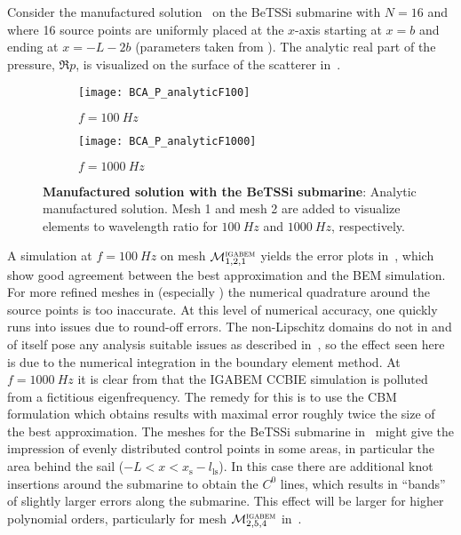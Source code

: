 Consider the manufactured solution~ on the BeTSSi submarine with $N=16$ and where 16 source points are uniformly placed at the $x$-axis starting at $x=b$ and ending at $x=-L-2b$ (parameters taken from ). The analytic real part of the pressure, $\Re{p}$, is visualized on the surface of the scatterer in~. 
\begin{figure}
	\centering
	\begin{subfigure}[t]{\textwidth}
		\texttt{[image: BCA\_P\_analyticF100]}
		\caption{$f=\SI{100}{Hz}$}
	\end{subfigure} 
	\par\bigskip
	\begin{subfigure}[t]{\textwidth}
		\texttt{[image: BCA\_P\_analyticF1000]}
		\caption{$f=\SI{1000}{Hz}$}
	\end{subfigure} 
	\caption{\textbf{Manufactured solution with the BeTSSi submarine}: Analytic manufactured solution. Mesh 1 and mesh 2 are added to visualize elements to wavelength ratio for $\SI{100}{Hz}$ and $\SI{1000}{Hz}$, respectively.}
	\label{Fig3:BCA_P_analytic}
\end{figure}
A simulation at $f=\SI{100}{Hz}$ on mesh ${\cal M}_{1,2,1}^{\textsc{igabem}}$ yields the error plots in~, which show good agreement between the best approximation and the BEM simulation. For more refined meshes in  (especially ) the numerical quadrature around the source points is too inaccurate. At this level of numerical accuracy, one quickly runs into issues due to round-off errors. The non-Lipschitz domains do not in and of itself pose any analysis suitable issues as described in~, so the effect seen here is due to the numerical integration in the boundary element method. At $f=\SI{1000}{Hz}$ it is clear from  that the IGABEM CCBIE simulation is polluted from a fictitious eigenfrequency. The remedy for this is to use the CBM formulation which obtains results with maximal error roughly twice the size of the best approximation. The meshes for the BeTSSi submarine in~ might give the impression of evenly distributed control points in some areas, in particular the area behind the sail ($-L<x<x_{\mathrm{s}}-l_{\mathrm{ls}}$). In this case there are additional knot insertions around the submarine to obtain the $C^0$ lines, which results in ``bands'' of slightly larger errors along the submarine. This effect will be larger for higher polynomial orders, particularly for mesh ${\cal M}_{2,5,4}^{\textsc{igabem}}$ in~.
